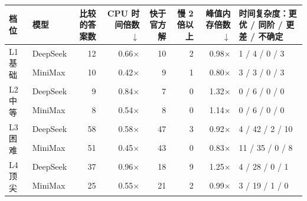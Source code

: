 \begin{tabular}{llrrrrrl}
\toprule
档位 & 模型 & 比较的答案数 & CPU 时间倍数 $\downarrow$ & 快于官方解 & 慢 2 倍以上 & 峰值内存倍数 $\downarrow$ & 时间复杂度：更优 / 同阶 / 更差 / 不确定 \\
\midrule
\multirow{2}{*}{L1 基础} & DeepSeek & 12 & 0.66$\times$ & 10 & 2 & 0.98$\times$ & 1 / 4 / 0 / 3 \\
 & MiniMax & 10 & 0.42$\times$ & 9 & 1 & 0.80$\times$ & 3 / 3 / 0 / 3 \\
\midrule
\multirow{2}{*}{L2 中等} & DeepSeek & 9 & 0.84$\times$ & 7 & 0 & 1.32$\times$ & 0 / 6 / 0 / 0 \\
 & MiniMax & 8 & 0.54$\times$ & 8 & 0 & 1.14$\times$ & 0 / 6 / 0 / 0 \\
\midrule
\multirow{2}{*}{L3 困难} & DeepSeek & 58 & 0.58$\times$ & 47 & 3 & 0.92$\times$ & 4 / 42 / 2 / 10 \\
 & MiniMax & 51 & 0.45$\times$ & 43 & 0 & 0.83$\times$ & 11 / 35 / 0 / 8 \\
\midrule
\multirow{2}{*}{L4 顶尖} & DeepSeek & 37 & 0.96$\times$ & 18 & 9 & 1.25$\times$ & 4 / 28 / 0 / 1 \\
 & MiniMax & 25 & 0.55$\times$ & 21 & 2 & 0.99$\times$ & 3 / 19 / 1 / 0 \\
\bottomrule
\end{tabular}
